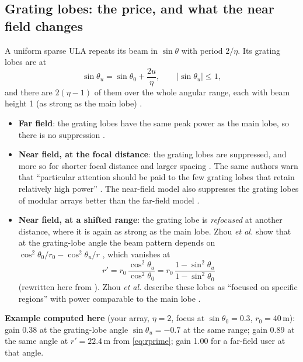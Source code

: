 \documentclass[11pt]{article}
\begin{document}
\subsection{Grating lobes: the price, and what the near field changes}
\label{sec:gl}
A uniform sparse ULA repeats its beam in $\sin\theta$ with period $2/\eta$. Its grating lobes are at \cite[Lemma~5, eq.~(23)]{zhou2025sparse}
\begin{equation}
  \sin\theta_u=\sin\theta_0+\frac{2u}{\eta},\qquad |\sin\theta_u|\le1,
  \label{eq:glangle}
\end{equation}
and there are $2(\eta-1)$ of them over the whole angular range, each with beam height 1 (as strong as the main lobe) \cite[Lemma~5]{zhou2025sparse}.
\begin{itemize}
  \item \textbf{Far field}: the grating lobes have the same peak power as the main lobe, so there is no suppression \cite[Sec.~IV, after Corollary~3]{chen2025exploring}.
  \item \textbf{Near field, at the focal distance}: the grating lobes are suppressed, and more so for shorter focal distance and larger spacing \cite[Corollary~3, eq.~(40)]{chen2025exploring}. The same authors warn that ``particular attention should be paid to the few grating lobes that retain relatively high power'' \cite[Sec.~IV]{chen2025exploring}. The near-field model also suppresses the grating lobes of modular arrays better than the far-field model \cite{li2023modular}.
  \item \textbf{Near field, at a shifted range}: the grating lobe is \emph{refocused} at another distance, where it is again as strong as the main lobe. Zhou \emph{et al.} show that at the grating-lobe angle the beam pattern depends on $\cos^2\theta_0/r_0-\cos^2\theta_u/r$ \cite[Lemma~6, eq.~(24)]{zhou2025sparse}, which vanishes at
  \begin{equation}
    r'=r_0\,\frac{\cos^2\theta_u}{\cos^2\theta_0}=r_0\,\frac{1-\sin^2\theta_u}{1-\sin^2\theta_0}
    \label{eq:rprime}
  \end{equation}
  (rewritten here from \cite[eq.~(24)]{zhou2025sparse}). Zhou \emph{et al.} describe these lobes as ``focused on specific regions'' with power comparable to the main lobe \cite[Abstract, Remark~2]{zhou2025sparse}.
\end{itemize}

\textbf{Example computed here} (your array, $\eta=2$, focus at $\sin\theta_0=0.3$, $r_0=40$\,m): gain 0.38 at the grating-lobe angle $\sin\theta_u=-0.7$ at the same range; gain 0.89 at the same angle at $r'=22.4$\,m from \eqref{eq:rprime}; gain 1.00 for a far-field user at that angle.
\end{document}
